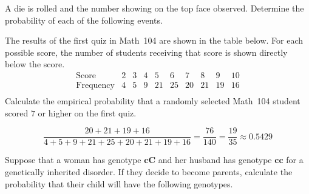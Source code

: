 \documentclass[answers,addpoints,12pt]{exam}
\begin{document}
\begin{questions}

\question[15] A die is rolled and the number
showing on the top face observed. Determine the probability
of each of the following events.
\ifprintanswers\else\newpage\fi

\question[10] The results of the first quiz in Math~104 are
shown in the table below. For each possible score, the number
of students receiving that score is shown directly below
the score.
\[\begin{array}{c|cccccccccc}
\text{Score}&2&3&4&5&6&7&8&9&10\\\hline
\text{Frequency}&4&5&9&21&25&20&21&19&16\\
\end{array}\]
Calculate the empirical probability that a randomly
selected Math~104 student scored $7$ or higher
on the first quiz.
\begin{solution}[2in]
\[\frac{20+21+19+16}{4+5+9+21+25+20+21+19+16}
=\frac{76}{140}=\frac{19}{35}\approx 0.5429\]
\end{solution}

\question[15] Suppose that a woman has genotype $\mathbold{cC}$
and her husband has genotype $\mathbold{cc}$ for a
genetically inherited disorder.
If they decide to become parents, calculate the
probability that their child will
have the following genotypes.
\end{questions}
\end{document}
